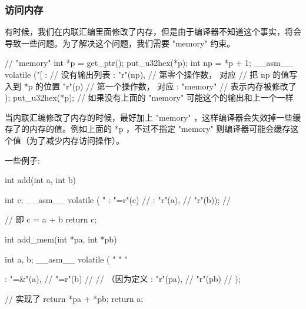 \subsubsection{访问内存}
有时候，我们在内联汇编里面修改了内存，但是由于编译器不知道这个事实，将会导致一些问题。为了解决这个问题，我们需要 "memory" 约束。
\begin{myccode}
// "memory"
int *p = get_ptr();
put_u32hex(*p);
int np = *p + 1;
__asm__ volatile ("[%
: // 没有输出列表
: "r"(np), // 第零个操作数， 对应 %
// 把 np 的值写入到 *p 的位置
"r"(p) // 第一个操作数， 对应 %
 : "memory" // 表示内存被修改了
 );
 put_u32hex(*p); // 如果没有上面的 "memory" 可能这个的输出和上一个一样
\end{myccode}

当内联汇编修改了内存的时候，最好加上 "memory" ，这样编译器会失效掉一些缓存了的内存的值。例如上面的 *p ，不过不指定 "memory" 则编译器可能会缓存这个值（为了减少内存访问操作）。

一些例子:
\begin{myccode}
int add(int a, int b)
{
    int c;
    __asm__ volatile (
    "%
    : "=r"(c) // %
    : "r"(a), // %
    "r"(b)); // %

     // 即 c = a + b
     return c;
}

int add_mem(int *pa, int *pb)
{
    int a, b;
    __asm__ volatile (
    "%
    "%
    "%

    :
    "=&"(a), // %
    "=r"(b) // %
    // （因为定义 %
    : "r"(pa), // %
    "r"(pb) // %
);

// 实现了 return *pa + *pb;
return a;
}
\end{myccode}
